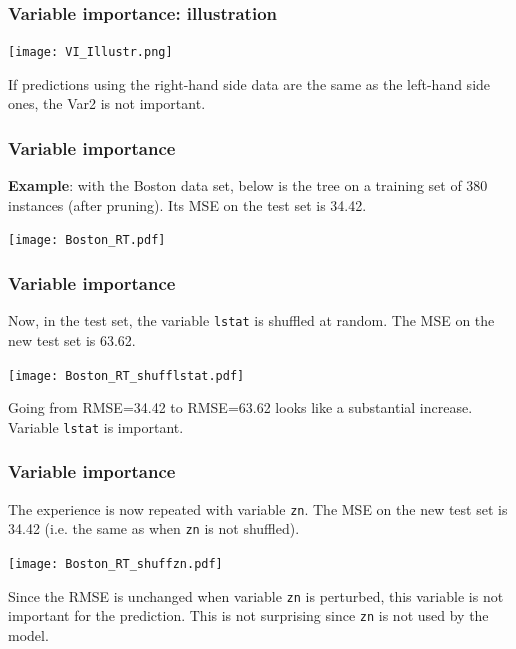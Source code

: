 \begin{frame}
\frametitle{Variable importance: illustration}
\begin{center}
\texttt{[image: VI\_Illustr.png]}
\end{center}
If predictions using the right-hand side data are the same as the left-hand side ones, the Var2 is not important.
\end{frame}
\begin{frame}
\frametitle{Variable importance}
{\bf Example}: with the Boston data set, below is the tree on a training set of 380 instances (after pruning). Its MSE on the test set is 34.42.
\begin{center}
\texttt{[image: Boston\_RT.pdf]}
\end{center}
\end{frame}
\begin{frame}
\frametitle{Variable importance}
Now, in the test set, the variable {\tt lstat} is shuffled at random. The MSE on the new test set is 63.62. 
\begin{center}
\texttt{[image: Boston\_RT\_shufflstat.pdf]}
\end{center}
Going from RMSE=34.42 to RMSE=63.62 looks like a substantial increase. Variable {\tt lstat} is important.
\end{frame}
\begin{frame}
\frametitle{Variable importance}
The experience is now repeated with variable {\tt zn}. The MSE on the new test set is 34.42 (i.e. the same as when {\tt zn} is not shuffled). 
\begin{center}
\texttt{[image: Boston\_RT\_shuffzn.pdf]}
\end{center}
Since the RMSE is unchanged when variable {\tt zn} is perturbed, this variable is not important for the prediction. This is not surprising since {\tt zn} is not used by the model. 
\end{frame}
